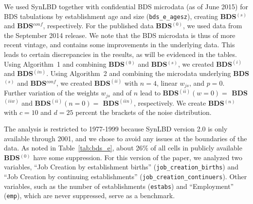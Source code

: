  We used \ac{SynLBD} \cite{SynLBD20}  together with confidential 
\ac{BDS} microdata (as of June 2015) for \ac{BDS} tabulations 
by establishment age and size ({\tt bds\_e\_agesz}), creating  \textbf{BDS$^{(s)}$} 
and 
\textbf{BDS$^{conf}$}, respectively. For the published data \textbf{BDS$^{(0)}$}, we used data 
from the September 2014 release. 
We note that the \ac{BDS} microdata is thus of more recent vintage, and contains some 
improvements in the underlying data. This leads to certain discrepancies in the results, as will be 
evidenced in the tables. 
Using Algorithm~1 and combining \textbf{BDS$^{(0)}$}  and \textbf{BDS$^{(s)}$}, we created 
\textbf{BDS$^{(i)}$} and 
\textbf{BDS$^{(in)}$}. Using Algorithm~2 and combining the microdata underlying 
\textbf{BDS$^{(s)}$} 
and 
\textbf{BDS$^{conf}$}, we created \textbf{BDS$^{(ii)}$} with $n=4$, linear $w_{js}$, and $p=0$. %
%
%
Further variation of the weights $w_{js}$ and of $n$ lead to \textbf{BDS$^{(ii)}(w=0) =$  
BDS$^{(iiw)}$}%
 and 
\textbf{BDS$^{(ii)}(n=0) =$ BDS$^{(iin)}$}, %
respectively. We create \textbf{BDS$^{(n)}$} with $c=10$ and $d=25$ percent the brackets of the noise distribution.


The analysis is restricted to 1977-1999 because \ac{SynLBD} version 2.0 is only available through 
2001, and we chose to avoid any issues at the boundaries of the data. %
%
As noted in Table~\ref{tab:bds_e}, about 26\% of all cells in publicly available 
\textbf{BDS$^{(0)}$} 
have some 
suppression. For this version of the paper, we analyzed two variables, ``Job Creation by 
establishment births'' ({\tt job\_creation\_births}) and ``Job Creation by 
continuing establishments'' ({\tt job\_creation\_continuers}). Other variables, such as the 
number of establishments ({\tt estabs}) and ``Employment'' ({\tt emp}), which are never 
suppressed, 
serve as a benchmark.

